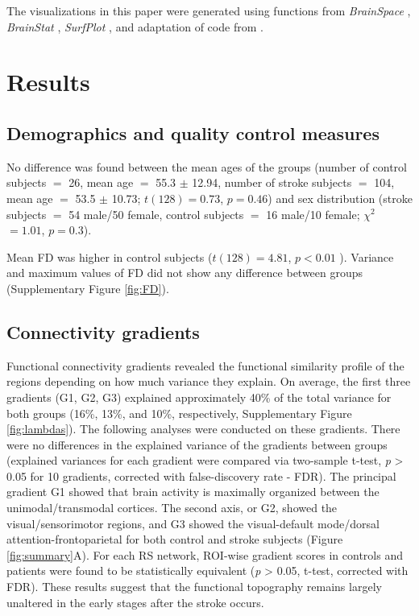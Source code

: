 \documentclass[fleqn,10pt]{wlscirep}
\begin{document}
The visualizations in this paper were generated using functions from \emph{BrainSpace} \citep{vos2020brainspace}, \emph{BrainStat}  \citep{worsley2009matlab}, \emph{SurfPlot} \citep{gale2021surfplot}, and adaptation of code from \citet{bayrakgithub}.

\section*{Results}

\subsection*{Demographics and quality control measures}
No difference was found between the mean ages of the groups (number of control subjects $=$ 26, mean age $=$ 55.3 $\pm$ 12.94, number of stroke subjects $=$ 104, mean age $=$ 53.5 $\pm$ 10.73; $t(128) = 0.73$, $p = 0.46$) and sex distribution (stroke subjects $=$ 54 male/50 female, control subjects $=$ 16 male/10 female; $\chi^2$ $ = 1.01$, $p = 0.3$).

Mean FD was higher in control subjects ($t(128) = 4.81$, $p < 0.01$ ). Variance and maximum values of FD did not show any difference between groups (Supplementary Figure \ref{fig:FD}).

\subsection*{Connectivity gradients}
Functional connectivity gradients revealed the functional similarity profile of the regions depending on how much variance they explain. On average, the first three gradients (G1, G2, G3) explained approximately 40\% of the total variance for both groups (16\%, 13\%, and 10\%, respectively, Supplementary Figure \ref{fig:lambdas}). The following analyses were conducted on these gradients. There were no differences in the explained variance of the gradients between groups (explained variances for each gradient were compared via two-sample t-test, \emph{p} > 0.05 for 10 gradients, corrected with false-discovery rate - FDR).  The principal gradient G1 showed that brain activity is maximally organized between the unimodal/transmodal cortices. The second axis, or G2, showed the visual/sensorimotor regions, and G3 showed the visual-default mode/dorsal attention-frontoparietal for both control and stroke subjects (Figure \ref{fig:summary}A). For each RS network, ROI-wise gradient scores in controls and patients were found to be statistically equivalent (\emph{p}  > 0.05, t-test, corrected with FDR). These results suggest that the functional topography remains largely unaltered in the early stages after the stroke occurs. %
\end{document}
